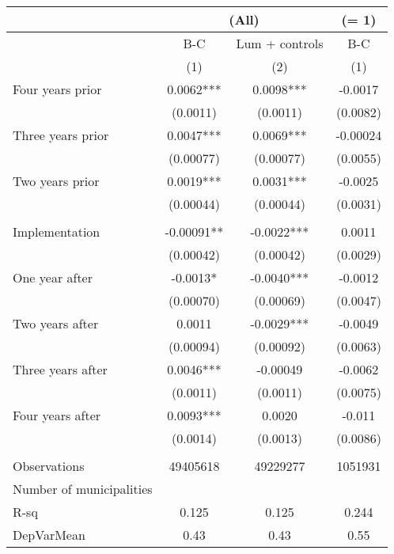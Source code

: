 \begin{tabular}{lccc}
\toprule
      & \multicolumn{2}{c}{(All)} & (= 1) \\
\midrule
      & B-C   & Lum + controls & B-C \\
\midrule
      & (1)   & (2)   & (1) \\
\midrule
\midrule
Four years prior & 0.0062*** & 0.0098*** & -0.0017 \\
      & (0.0011) & (0.0011) & (0.0082) \\
Three years prior & 0.0047*** & 0.0069*** & -0.00024 \\
      & (0.00077) & (0.00077) & (0.0055) \\
Two years prior & 0.0019*** & 0.0031*** & -0.0025 \\
      & (0.00044) & (0.00044) & (0.0031) \\
      &       &       &  \\
Implementation & -0.00091** & -0.0022*** & 0.0011 \\
      & (0.00042) & (0.00042) & (0.0029) \\
One year after & -0.0013* & -0.0040*** & -0.0012 \\
      & (0.00070) & (0.00069) & (0.0047) \\
Two years after & 0.0011 & -0.0029*** & -0.0049 \\
      & (0.00094) & (0.00092) & (0.0063) \\
Three years after & 0.0046*** & -0.00049 & -0.0062 \\
      & (0.0011) & (0.0011) & (0.0075) \\
Four years after & 0.0093*** & 0.0020 & -0.011 \\
      & (0.0014) & (0.0013) & (0.0086) \\
      &       &       &  \\
\midrule
Observations & 49405618 & 49229277 & 1051931 \\
Number of municipalities &       &       &  \\
R-sq  & 0.125 & 0.125 & 0.244 \\
DepVarMean & 0.43  & 0.43  & 0.55 \\
\bottomrule
\bottomrule
\end{tabular}%
